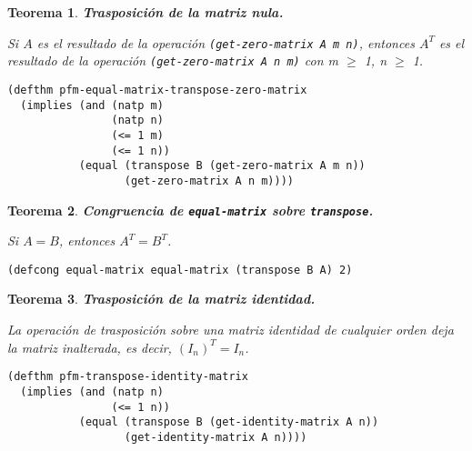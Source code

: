 \documentclass[a4paper,10pt]{article}
\newtheorem{teor}{{Teorema}}
\begin{document}
\begin{teor} \textbf{Trasposición de la matriz nula.}\vspace{8pt}\par
Si $A$ es el resultado de la operación \texttt{(get-zero-matrix A m n)}, entonces $A^T$ es el resultado de la operación \texttt{(get-zero-matrix A n m)} con m $\geq$ 1, n $\geq$ 1.
\end{teor}

\begin{lstlisting}[language=clips]
(defthm pfm-equal-matrix-transpose-zero-matrix
  (implies (and (natp m)
                (natp n)
                (<= 1 m)
                (<= 1 n))
           (equal (transpose B (get-zero-matrix A m n))
                  (get-zero-matrix A n m))))
\end{lstlisting}

\par \vspace{16pt}

\begin{teor} \textbf{Congruencia de \texttt{equal-matrix} sobre \texttt{transpose}.}\vspace{8pt}\par
Si $A=B$, entonces $A^T=B^T$.
\end{teor}

\begin{lstlisting}[language=clips]
(defcong equal-matrix equal-matrix (transpose B A) 2)
\end{lstlisting}

\par \vspace{16pt}

\begin{teor} \textbf{Trasposición de la matriz identidad.}\vspace{8pt}\par
La operación de trasposición sobre una matriz identidad de cualquier orden deja la matriz inalterada, es decir, $(I_n)^T = I_n$.
\end{teor}

\begin{lstlisting}[language=clips]
(defthm pfm-transpose-identity-matrix
  (implies (and (natp n)
                (<= 1 n))
           (equal (transpose B (get-identity-matrix A n))
                  (get-identity-matrix A n))))
\end{lstlisting}

\par \vspace{16pt}
\end{document}

